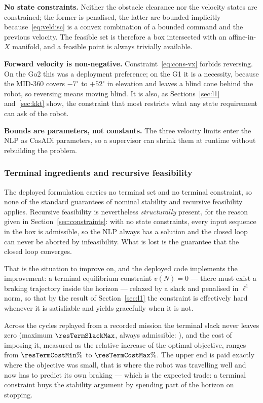\documentclass[11pt,a4paper]{article}
\begin{document}
\textbf{No state constraints.} Neither the obstacle clearance nor the velocity states are constrained; the
former is penalised, the latter are bounded implicitly because~\eqref{eq:veldisc} is a convex combination of
a bounded command and the previous velocity. The feasible set is therefore a box intersected with an
affine-in-$X$ manifold, and a feasible point is always trivially available.

\textbf{Forward velocity is non-negative.} Constraint~\eqref{eq:cons-vx} forbids reversing. On the Go2 this
was a deployment preference; on the G1 it is a necessity, because the MID-360 covers $-7^\circ$ to
$+52^\circ$ in elevation and leaves a blind cone behind the robot, so reversing means moving blind. It is
also, as Sections~\ref{sec:l1} and~\ref{sec:kkt} show, the constraint that most restricts what any state
requirement can ask of the robot.

\textbf{Bounds are parameters, not constants.} The three velocity limits enter the NLP as CasADi parameters,
so a supervisor can shrink them at runtime without rebuilding the problem.

\subsubsection{Terminal ingredients and recursive feasibility}
\label{sec:terminal}

The deployed formulation carries no terminal set and no terminal constraint, so none of the standard
guarantees of nominal stability and recursive feasibility \cite{mayne2000constrained} applies. Recursive
feasibility is nevertheless \emph{structurally} present, for the reason given in
Section~\ref{sec:constraints}: with no state constraints, every input sequence in the box is admissible, so
the NLP always has a solution and the closed loop can never be aborted by infeasibility. What is lost is the
guarantee that the closed loop converges.

That is the situation to improve on, and the deployed code implements the improvement: a terminal equilibrium
constraint $v(N)=0$ --- there must exist a braking trajectory inside the horizon --- relaxed by a slack and
penalised in $\ell^1$ norm, so that by the result of Section~\ref{sec:l1} the constraint is effectively hard
whenever it is satisfiable and yields gracefully when it is not.

Across the cycles replayed from a recorded mission the terminal slack never leaves zero (maximum
$\resTermSlackMax$, always admissible: \resTermFeasible), and the cost of imposing it, measured as the
relative increase of the optimal objective, ranges from $\resTermCostMin\%$ to $\resTermCostMax\%$. The upper
end is paid exactly where the objective was small, that is where the robot was travelling well and now has to
predict its own braking --- which is the expected trade: a terminal constraint buys the stability argument by
spending part of the horizon on stopping.
\end{document}

